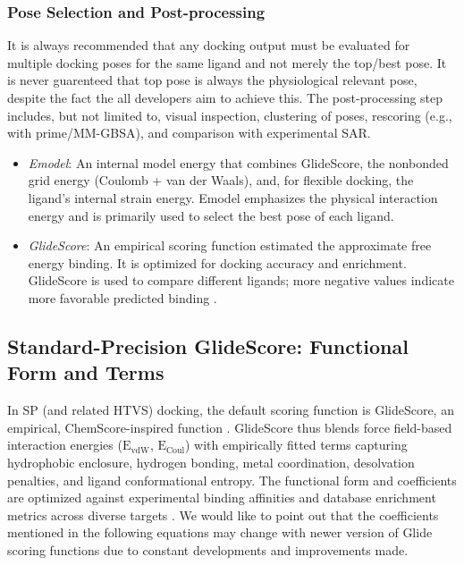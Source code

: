 \documentclass[12pt, a4paper]{article}
\begin{document}
\subsubsection{Pose Selection and Post-processing}

It is always recommended that any docking output must be evaluated for multiple docking poses for the same ligand and not merely the top/best pose. It is never guarenteed that top pose is always the physiological relevant pose, despite the fact the all developers aim to achieve this. The post-processing step includes, but not limited to, visual inspection, clustering of poses, rescoring (e.g., with prime/MM-GBSA), and comparison with experimental SAR. 

\begin{itemize}
  \item \textit{Emodel}: An internal model energy that combines GlideScore, the nonbonded grid energy (Coulomb + van der Waals), and, for flexible docking, the ligand's internal strain energy. Emodel emphasizes the physical interaction energy and is primarily used to select the best pose of each ligand.
  \item \textit{GlideScore}: An empirical scoring function estimated the approximate free energy binding. It is optimized for docking accuracy and enrichment. GlideScore is used to compare different ligands; more negative values indicate more favorable predicted binding \cite{CH7_Friesner2004b}.
\end{itemize}


\subsection{Standard-Precision GlideScore: Functional Form and Terms}

In SP (and related HTVS) docking, the default scoring function is GlideScore, an empirical, ChemScore-inspired function \cite{CH7_Friesner2004a,CH7_Friesner2004b}. GlideScore thus blends force field-based interaction energies ($\text{E}_{\text{vdW}}$, $\text{E}_{\text{Coul}}$) with empirically fitted terms capturing hydrophobic enclosure, hydrogen bonding, metal coordination, desolvation penalties, and ligand conformational entropy. The functional form and coefficients are optimized against experimental binding affinities and database enrichment metrics across diverse targets \cite{CH7_Friesner2004b,CH7_Friesner2006}. We would like to point out that the coefficients mentioned in the following equations may change with newer version of Glide scoring functions due to constant developments and improvements made. 
\end{document}
